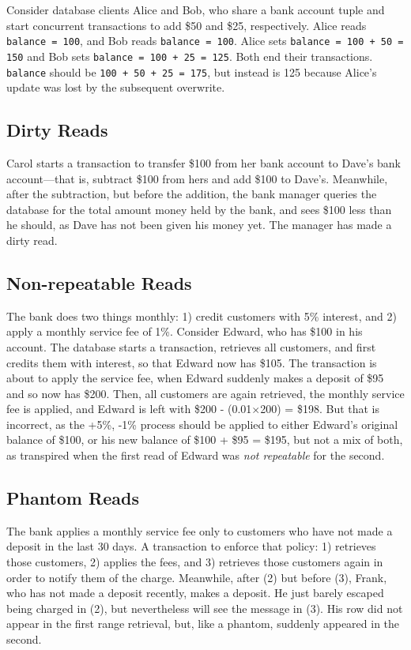 \documentclass[12pt]{article} %
\begin{document}
Consider database clients Alice and Bob, who share a bank account tuple and start concurrent transactions to add \$50 and \$25, respectively. Alice reads \texttt{balance = 100}, and Bob reads \texttt{balance = 100}. Alice sets \texttt{balance = 100 + 50 = 150} and Bob sets \texttt{balance = 100 + 25 = 125}. Both end their transactions. \texttt{balance} should be \texttt{100 + 50 + 25 = 175}, but instead is 125 because Alice's update was lost by the subsequent overwrite.

\subsection{Dirty Reads}
Carol starts a transaction to transfer \$100 from her bank account to Dave's bank account---that is, subtract \$100 from hers and add \$100 to Dave's. Meanwhile, after the subtraction, but before the addition, the bank manager queries the database for the total amount money held by the bank, and sees \$100 less than he should, as Dave has not been given his money yet. The manager has made a dirty read.

\subsection{Non-repeatable Reads}
The bank does two things monthly: 1) credit customers with 5\% interest, and 2) apply a monthly service fee of 1\%. Consider Edward, who has \$100 in his account. The database starts a transaction, retrieves all customers, and first credits them with interest, so that Edward now has \$105. The transaction is about to apply the service fee, when Edward suddenly makes a deposit of \$95 and so now has \$200. Then, all customers are again retrieved, the monthly service fee is applied, and Edward is left with \$200 - (0.01$\times$200) = \$198. But that is incorrect, as the +5\%, -1\% process should be applied to either Edward's original balance of \$100, or his new balance of \$100 + \$95 = \$195, but not a mix of both, as transpired when the first read of Edward was \textsl{not repeatable} for the second.

\subsection{Phantom Reads}
The bank applies a monthly service fee only to customers who have not made a deposit in the last 30 days. A transaction to enforce that policy: 1) retrieves those customers, 2) applies the fees, and 3) retrieves those customers again in order to notify them of the charge. Meanwhile, after (2) but before (3), Frank, who has not made a deposit recently, makes a deposit. He just barely escaped being charged in (2), but nevertheless will see the message in (3). His row did not appear in the first range retrieval, but, like a phantom, suddenly appeared in the second.
\end{document}
